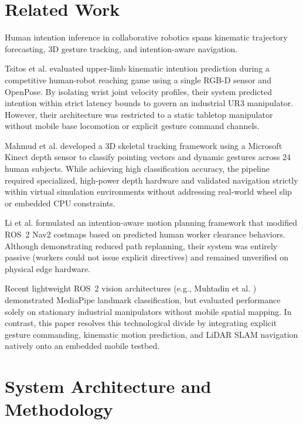 \documentclass[conference]{IEEEtran}
\begin{document}
\section{Related Work}
Human intention inference in collaborative robotics spans kinematic trajectory forecasting, 3D gesture tracking, and intention-aware navigation.

Tsitos et al. \cite{tsitos2022} evaluated upper-limb kinematic intention prediction during a competitive human-robot reaching game using a single RGB-D sensor and OpenPose. By isolating wrist joint velocity profiles, their system predicted intention within strict latency bounds to govern an industrial UR3 manipulator. However, their architecture was restricted to a static tabletop manipulator without mobile base locomotion or explicit gesture command channels.

Mahmud et al. \cite{mahmud2022} developed a 3D skeletal tracking framework using a Microsoft Kinect depth sensor to classify pointing vectors and dynamic gestures across 24 human subjects. While achieving high classification accuracy, the pipeline required specialized, high-power depth hardware and validated navigation strictly within virtual simulation environments without addressing real-world wheel slip or embedded CPU constraints.

Li et al. \cite{li2023} formulated an intention-aware motion planning framework that modified ROS~2 Nav2 costmaps based on predicted human worker clearance behaviors. Although demonstrating reduced path replanning, their system was entirely passive (workers could not issue explicit directives) and remained unverified on physical edge hardware.

Recent lightweight ROS~2 vision architectures (e.g., Muhtadin et al. \cite{muhtadin2025}) demonstrated MediaPipe landmark classification, but evaluated performance solely on stationary industrial manipulators without mobile spatial mapping. In contrast, this paper resolves this technological divide by integrating explicit gesture commanding, kinematic motion prediction, and LiDAR SLAM navigation natively onto an embedded mobile testbed.

\section{System Architecture and Methodology}
\end{document}
